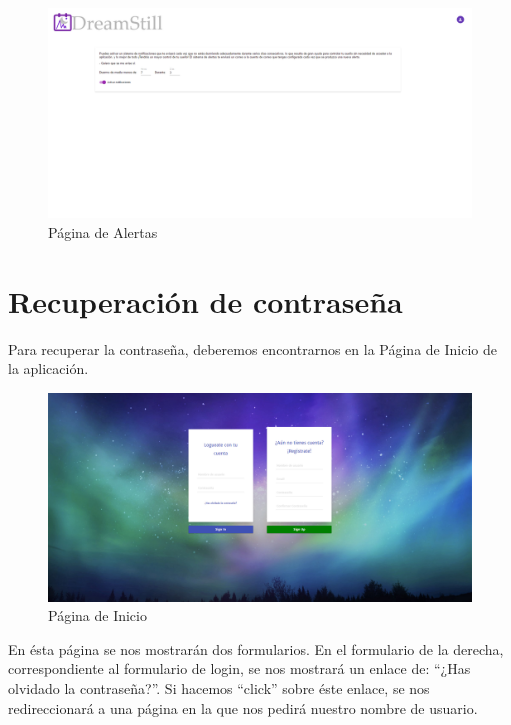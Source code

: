 \documentclass[11pt,openany]{book}
\begin{document}
\begin{figure}[H]
\centering
\includegraphics[totalheight=6cm]{manualUsuario/paginaAlertas.png}
\caption{Página de Alertas}
\end{figure}

\section{Recuperación de contraseña}

Para recuperar la contraseña, deberemos encontrarnos en la Página de Inicio de la aplicación.

\begin{figure}[H]
\centering
\includegraphics[totalheight=6cm]{manualUsuario/paginaInicio.png}
\caption{Página de Inicio}
\end{figure}

En ésta página se nos mostrarán dos formularios. En el formulario de la derecha, correspondiente al formulario de login, se nos mostrará un enlace de: ``¿Has olvidado la contraseña?''. Si hacemos ``click'' sobre éste enlace, se nos redireccionará a una página en la que nos pedirá nuestro nombre de usuario.
\end{document}
